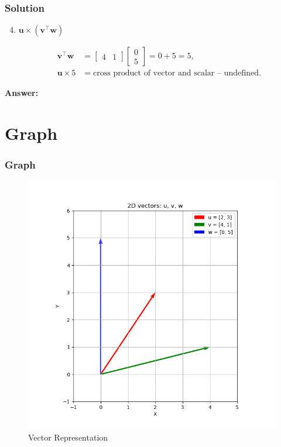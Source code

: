 \documentclass{beamer}
\theoremstyle{remark}
\numberwithin{equation}{section}
\begin{document}
\begin{frame}[fragile]
    \frametitle{Solution}
\begin{enumerate}[label=\alph*) ]
\setcounter{enumi}{3} 
 

  This is meaningful scalar multiplication.

  \item \( \mathbf{u} \times (\mathbf{v}^\top \mathbf{w}) \)

  \begin{align*}
  \mathbf{v}^\top \mathbf{w} &= \begin{bmatrix} 4 & 1 \end{bmatrix} \begin{bmatrix} 0 \\ 5 \end{bmatrix} = 0 + 5 = 5,
  \\
  \mathbf{u} \times 5 &= \text{cross product of vector and scalar -- undefined}.
  \end{align*}
  
\end{enumerate}

\textbf{Answer:}


\end{frame}
\section{Graph}
\begin{frame}
    \frametitle{Graph}
    \begin{figure}[htbp]
    \centering
    \includegraphics[width=0.65\linewidth]{FIG/fig1.png}
    \caption{Vector Representation}
    \label{fig:FIG/fig1.png}
\end{figure}
\end{frame}
\end{document}
